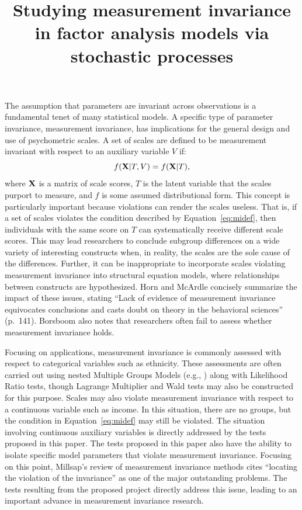 \documentclass[man]{apa}
\title{Studying measurement invariance in factor analysis models
  via stochastic processes}
\begin{document}
\maketitle

The assumption that parameters are
invariant across observations is a
fundamental tenet of many statistical models.  A specific type of 
parameter invariance, measurement invariance, has implications for the
general design and use of psychometric scales.
A set of scales are defined to be measurement invariant with respect to
an auxiliary variable $V$ if:
\begin{equation}
    \label{eq:midef}
      f({\bf X} | T, V) = f({\bf X} | T),
\end{equation}
where ${\bf X}$ is a matrix of scale scores, $T$ is the latent
variable that the scales purport to measure, and $f$ is some assumed
distributional form.  This concept is 
particularly important because violations can render the scales
useless.  
That is, if a set of scales violates the condition described by
Equation~\eqref{eq:midef}, then individuals with the same
score on $T$ can systematically receive 
different scale scores.
This may lead researchers to conclude subgroup
differences on a wide variety of interesting constructs 
when, in reality, the scales are the sole cause of the 
differences.  Further, it can be inappropriate to incorporate scales
violating measurement invariance into structural equation
models, where relationships between constructs are hypothesized.  Horn
and McArdle \citeyear{HorMca92} concisely summarize the impact of
these issues, stating ``Lack of evidence of measurement 
invariance equivocates conclusions and casts doubt on theory in the
behavioral sciences'' (p.\ 141).  Borsboom \citeyear{Bor06a} also
notes that researchers often fail to assess whether measurement
invariance holds.

Focusing on applications, measurement
invariance is commonly assessed with respect to categorical variables
such as ethnicity. 
These assessments are often carried out using nested Multiple Groups
Models (e.g., ) along with Likelihood Ratio tests,
though 
Lagrange Multiplier and Wald tests may also be constructed for this
purpose.
Scales may also violate measurement invariance with
respect to a continuous variable such as income.  In this situation,
there are no groups, but the condition in Equation~\eqref{eq:midef}
may still be violated.  The situation involving continuous auxiliary
variables is directly addressed by the tests proposed in this paper.
The tests proposed in this paper also have the ability to isolate
specific model parameters that violate measurement invariance.
Focusing on this point, Millsap's \citeyear{Mil05} review of 
measurement invariance methods cites ``locating the violation of the
invariance'' as one of the major outstanding problems.  The tests
resulting from the proposed project directly address this issue,
leading to an important advance in measurement invariance research.
\end{document}
